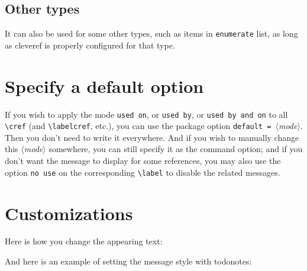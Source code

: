 \documentclass[
    use style = plain,
    title in boldface,
    emphasize theorems,
    simple name, %
    name in link,
]{einfart}
\newcommand{\meta}[1]{$\langle${\normalfont\itshape#1}$\rangle$}
\newcommand{\packageoption}[1]{\texttt{\textcolor{code-option}{#1}}}
\newcommand{\commandoption}[1]{\texttt{\textcolor{code-keys}{#1}}}
\begin{document}
\subsection{Other types}

It can also be used for some other types, such as items in \texttt{enumerate} list, as long as \textsf{cleveref} is properly configured for that type.

\section{Specify a default option}

If you wish to apply the mode \commandoption{used on}, or \commandoption{used by}, or \commandoption{used by and on} to all \lstinline|\cref| (and \lstinline|\labelcref|, etc.), you can use the package option \packageoption{default = }\meta{mode}. Then you don't need to write it everywhere. And if you wish to manually change this \meta{mode} somewhere, you can still specify it as the command option; and if you don't want the message to display for some references, you may also use the option \commandoption{no use} on the corresponding \lstinline|\label| to disable the related messages.


\section{Customizations}

\begingroup

Here is how you change the appearing text:

\begin{code}
\end{code}


\bigskip
And here is an example of setting the message style with \textsf{todonotes}:

\begin{code}
\SetForwardReferenceStyle
  {%
  }
\SetForwardReferenceStyleOutsideMath
  {%
  }
\end{code}
\end{document}

